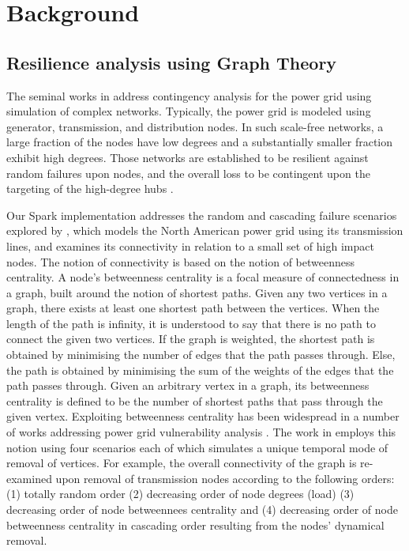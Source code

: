 \section{Background}
\label{background}

\subsection{Resilience analysis using Graph Theory}
\label{resilience}

The seminal works in \cite{2000Natur.406..378A,DaqingAl14} address contingency analysis for the power grid using simulation of complex networks. Typically, the power grid is modeled using generator, transmission, and distribution nodes. In such scale-free networks, a large fraction of the nodes have low degrees and a substantially smaller fraction exhibit high degrees. Those networks are established to be resilient against random failures upon nodes, and the overall loss to be contingent upon the targeting of the high-degree hubs \cite{AlbertAl00, CohenAl00, CohenAl01, CallawayAl00}. 

Our Spark implementation addresses the random and cascading failure scenarios explored by \cite{2000Natur.406..378A}, which models the North American power grid using its transmission lines, and examines its connectivity in relation to a small set of high impact nodes. The notion of connectivity is based on the notion of betweenness centrality. A node's betweenness centrality is a focal measure of connectedness in a graph, built around the notion of shortest paths. Given any two vertices in a graph, there exists at least one shortest path between the vertices. When the length of the path is infinity, it is understood to say that there is no path to connect the given two vertices. If the graph is weighted, the shortest path is obtained by minimising the number of edges that the path passes through. Else, the path is obtained by minimising the sum of the weights of the edges that the path passes through. Given an arbitrary vertex in a graph, its betweenness centrality is defined to be the number of shortest paths that pass through the given vertex. Exploiting betweenness centrality has been widespread in a number of works addressing power grid vulnerability analysis \cite{2000Natur.406..378A,JinAl10}. The work in \cite{2000Natur.406..378A} employs this notion using four scenarios each of which simulates a unique temporal mode of removal of vertices. For example, the overall connectivity of the graph is re-examined upon removal of transmission nodes according to the following orders: (1) totally random order (2) decreasing order of node degrees (load) (3) decreasing order of node betweennees centrality and (4) decreasing order of node betweenness centrality in cascading order resulting from the nodes' dynamical removal. 

